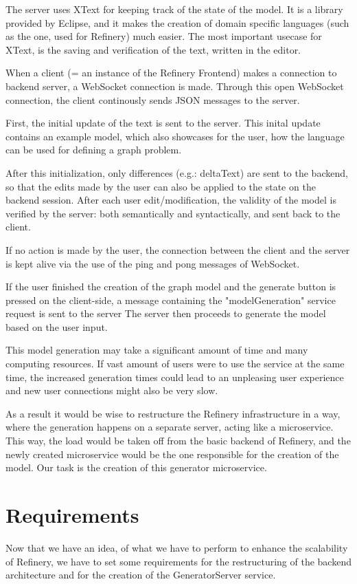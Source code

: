 	The server uses XText for keeping track of the state of the model. It is a library provided
	by Eclipse, and it makes the creation of domain specific languages (such as the one, used for Refinery)
	much easier. The most important usecase for XText, is the saving and verification of the text, 
	written in the editor.

	When a client (= an instance of the Refinery Frontend) makes a connection to backend server, a WebSocket 
	connection is made. Through this open WebSocket connection, the client continously sends JSON messages to
	the server.

	First, the initial update of the text is sent to the server.
	This inital update contains an example model, which also showcases for the user, how the language can be used
	for defining a graph problem. 
	
	After this initialization, only differences (e.g.: deltaText) are sent to the backend, so that 
	the edits made by the user can also be applied to the state on the backend session. 
	After each user edit/modification, the
	validity of the model is verified by the server: both semantically and syntactically, and sent back to the client.

	If no action is made by the user, the connection between the client and the server
	is kept alive via the use of the ping and pong messages of WebSocket.

	If the user finished the creation of the graph model and the generate button is pressed 
	on the client-side, a message containing the "modelGeneration" service request is sent to the server 
	The server then proceeds to generate the model based on the user input.

	This model generation may take a significant amount of time and many computing resources. 
	If vast amount of users were to use 
	the service at the same time, the increased generation times could lead to an unpleasing user experience and 
	new user connections might also be very slow. 
	
	As a result it would be wise to restructure the Refinery infrastructure in a way, 
	where the generation happens on a separate server,
	acting like a microservice. This way, the load would be taken off from 
	the basic backend of Refinery, and the newly created microservice would be the one responsible for
	the creation of the model.
	Our task is the creation of this generator microservice.

\section{Requirements} \label{requirements}
Now that we have an idea, of what we have to perform to enhance the scalability of Refinery, we have to set some requirements for the
restructuring of the backend architecture and for the creation of the GeneratorServer service. 

